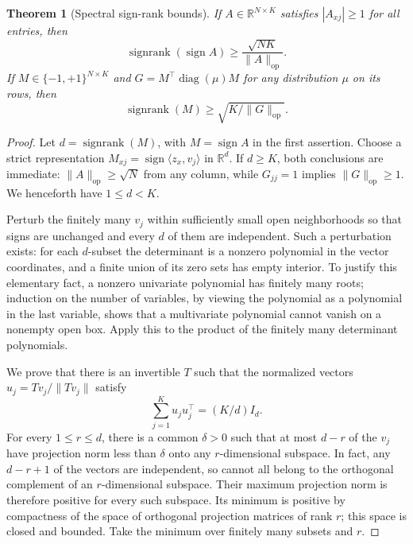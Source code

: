 \documentclass[11pt]{article}
\newtheorem{theorem}{Theorem}
\DeclareMathOperator{\sr}{signrank}
\DeclareMathOperator{\sign}{sign}
\DeclareMathOperator{\diag}{diag}
\newcommand{\R}{\mathbb R}
\newcommand{\1}{\mathbf 1}
\newcommand{\op}{\mathrm{op}}
\begin{document}
\begin{theorem}[Spectral sign-rank bounds]\label{thm:forster}
If $A\in\R^{N\times K}$ satisfies $|A_{xj}|\geq1$ for all entries, then
\begin{equation}\label{eq:forster}
 \sr(\sign A)\geq\frac{\sqrt{NK}}{\|A\|_\op}.
\end{equation}
If $M\in\{-1,+1\}^{N\times K}$ and $G=M^\top\diag(\mu)M$ for any distribution $\mu$ on its rows, then
\begin{equation}\label{eq:weighted}
 \sr(M)\geq\sqrt{K/\|G\|_\op}.
\end{equation}
\end{theorem}
\begin{proof}
Let $d=\sr(M)$, with $M=\sign A$ in the first assertion. Choose a strict representation
$M_{xj}=\sign\langle z_x,v_j\rangle$ in $\R^d$. If $d\geq K$, both conclusions are immediate: $\|A\|_\op\geq\sqrt N$ from any column, while $G_{jj}=1$ implies $\|G\|_\op\geq1$. We henceforth have $1\leq d<K$.

Perturb the finitely many $v_j$ within sufficiently small open neighborhoods so that signs are unchanged and every $d$ of them are independent. Such a perturbation exists: for each $d$-subset the determinant is a nonzero polynomial in the vector coordinates, and a finite union of its zero sets has empty interior. To justify this elementary fact, a nonzero univariate polynomial has finitely many roots; induction on the number of variables, by viewing the polynomial as a polynomial in the last variable, shows that a multivariate polynomial cannot vanish on a nonempty open box. Apply this to the product of the finitely many determinant polynomials.

We prove that there is an invertible $T$ such that the normalized vectors
$u_j=Tv_j/\|Tv_j\|$ satisfy
\begin{equation}\label{eq:isotropy}
 \sum_{j=1}^K u_ju_j^\top=(K/d)I_d.
\end{equation}
For every $1\leq r\leq d$, there is a common $\delta>0$ such that at most $d-r$ of the $v_j$ have projection norm less than $\delta$ onto any $r$-dimensional subspace. In fact, any $d-r+1$ of the vectors are independent, so cannot all belong to the orthogonal complement of an $r$-dimensional subspace. Their maximum projection norm is therefore positive for every such subspace. Its minimum is positive by compactness of the space of orthogonal projection matrices of rank $r$; this space is closed and bounded. Take the minimum over finitely many subsets and $r$.


\end{proof}
\end{document}
